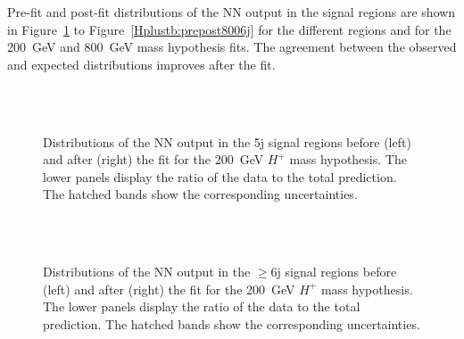 Pre-fit and post-fit distributions of the NN output in the signal regions are shown in Figure~\ref{Hplustb:prepost2005j} to Figure~\ref{Hplustb:prepost8006j} for the different regions and for the 200~GeV and 800~GeV mass hypothesis fits. The agreement between the observed and expected distributions improves after the fit.\\

\begin{figure}[htb]
    \RawFloats
    \centering
    \\
    \\
    \caption{Distributions of the NN output in the 5j signal regions before (left) and after (right) the fit for the 200~GeV $H^+$ mass hypothesis. The lower panels display the ratio of the data to the total prediction. The hatched bands show the corresponding uncertainties.
    }
    \label{Hplustb:prepost2005j}
\end{figure}

\begin{figure}[htb]
    \RawFloats
    \centering
    \\
    \\
    \caption{Distributions of the NN output in the $\geq$6j signal regions before (left) and after (right) the fit for the 200~GeV $H^+$ mass hypothesis. The lower panels display the ratio of the data to the total prediction. The hatched bands show the corresponding uncertainties.
    }
    \label{Hplustb:prepost2006j}
\end{figure}

